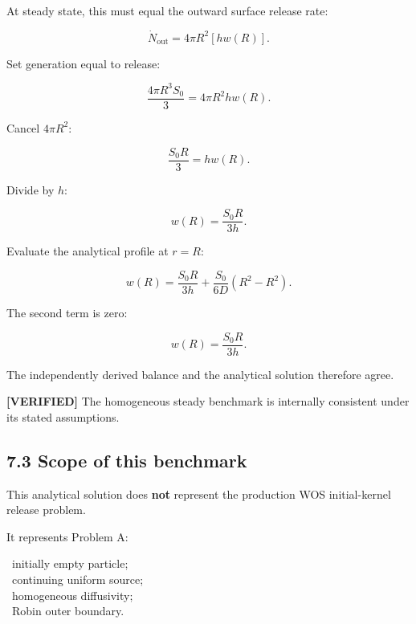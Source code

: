 \documentclass[11pt,a4paper]{article}
\begin{document}
At steady state, this must equal the outward surface release rate:

\begin{equation}
\dot N_{\mathrm{out}}
=
4\pi R^2
\left[
h w(R)
\right].
\tag{TRISO-ANA-136}
\label{eq:triso-ana-136}
\end{equation}

Set generation equal to release:

\begin{equation}
\frac{4\pi R^3S_0}{3}
=
4\pi R^2h w(R).
\tag{TRISO-ANA-137}
\label{eq:triso-ana-137}
\end{equation}

Cancel $4\pi R^2$:

\begin{equation}
\frac{S_0R}{3}
=
h w(R).
\tag{TRISO-ANA-138}
\label{eq:triso-ana-138}
\end{equation}

Divide by $h$:

\begin{equation}
w(R)=\frac{S_0R}{3h}.
\tag{TRISO-ANA-139}
\label{eq:triso-ana-139}
\end{equation}

Evaluate the analytical profile at $r=R$:

\begin{equation}
w(R)
=
\frac{S_0R}{3h}
+
\frac{S_0}{6D}(R^2-R^2).
\tag{TRISO-ANA-140}
\label{eq:triso-ana-140}
\end{equation}

The second term is zero:

\begin{equation}
w(R)
=
\frac{S_0R}{3h}.
\tag{TRISO-ANA-141}
\label{eq:triso-ana-141}
\end{equation}

The independently derived balance and the analytical solution therefore agree.

\textbf{[VERIFIED]} The homogeneous steady benchmark is internally consistent under its stated assumptions.

\subsection*{7.3 Scope of this benchmark}

This analytical solution does \textbf{not} represent the production WOS initial-kernel release problem.

It represents Problem A:

\noindent\textbullet\ initially empty particle;\\
\noindent\textbullet\ continuing uniform source;\\
\noindent\textbullet\ homogeneous diffusivity;\\
\noindent\textbullet\ Robin outer boundary.\\
\end{document}
